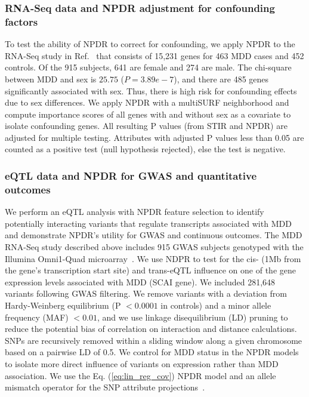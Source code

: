\documentclass{bioinfo}
\begin{document}
\subsubsection{RNA-Seq data and NPDR adjustment for confounding factors}
To test the ability of NPDR to correct for confounding, we apply NPDR to the RNA-Seq study in Ref.~\citep{mostafavi14} that consists of 15,231 genes for 463 MDD cases and 452 controls.
Of the 915 subjects, 641 are female and 274 are male.
The chi-square between MDD and sex is $25.75$ ($P=3.89e-7$), and there are 485 genes significantly associated with sex.
Thus, there is high risk for confounding effects due to sex differences.
We apply NPDR with a multiSURF neighborhood and compute importance scores of all genes with and without sex as a covariate to isolate confounding genes. All resulting P values (from STIR and NPDR) are adjusted for multiple testing.
Attributes with adjusted P values less than 0.05 are counted as a positive test (null hypothesis rejected), else the test is negative.

\subsubsection{eQTL data and NPDR for GWAS and quantitative outcomes}
We perform an eQTL analysis with NPDR feature selection to identify potentially interacting variants that regulate transcripts associated with MDD and demonstrate NPDR's utility for GWAS and continuous outcomes.
The MDD RNA-Seq study described above includes 915 GWAS subjects genotyped with the Illumina Omni1-Quad microarray~\citep{mostafavi14}.
We use NDPR to test for the cis- (1Mb from the gene's transcription start site) and trans-eQTL influence on one of the gene expression levels associated with MDD (SCAI gene).
We included 281,648 variants following GWAS filtering.
We remove variants with a deviation from Hardy-Weinberg equilibrium (P $<0.0001$ in controls) and a minor allele frequency (MAF) $<0.01$, and we use linkage disequilibrium (LD) pruning to reduce the potential bias of correlation on interaction and distance calculations.
SNPs are recursively removed within a sliding window along a given chromosome based on a pairwise LD of 0.5.
We control for MDD status in the NPDR models to isolate more direct influence of variants on expression rather than MDD association. We use the Eq. (\ref{eq:lin_reg_cov}) NPDR model and an allele mismatch operator for the SNP attribute projections~\citep{titv}. 
\end{document}
